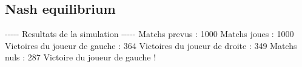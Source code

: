\documentclass{article}%
\begin{document}
%
\subsection{Nash equilibrium}%
\label{subsec:Nash equilibrium}%
{-}{-}{-}{-}{-} Resultats de la simulation {-}{-}{-}{-}{-}\newline%
		\newline%
Matchs prevus : 1000\newline%
Matchs joues : 1000\newline%
\newline%
Victoires du joueur de gauche : 364\newline%
Victoires du joueur de droite : 349\newline%
Matchs nuls : 287\newline%
\newline%
Victoire du joueur de gauche !

%
\end{document}
